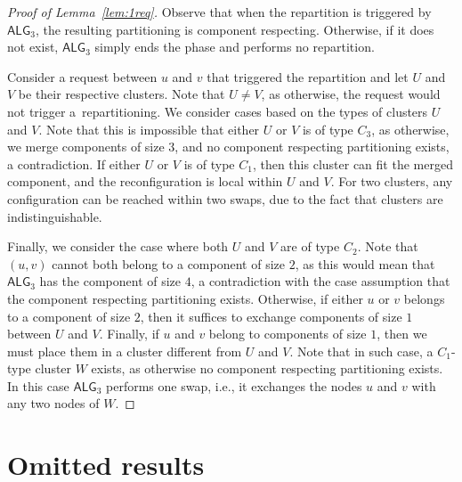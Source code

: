 \documentclass[manuscript,screen=true, review, anonymous]{acmart}
\newcommand{\TAlg}{{\ensuremath{\textsf{ALG}_{3}}}\xspace} %
\begin{document}
\begin{proof}[Proof of Lemma~\ref{lem:1req}]
  Observe that when the repartition is triggered by \TAlg, the resulting partitioning is component respecting.
  Otherwise, if it does not exist, \TAlg simply ends the phase and performs no repartition.

  
    Consider a request between $u$ and $v$ that triggered the repartition and let $U$ and $V$ be their respective clusters.
    Note that $U\neq V$,
	 as otherwise, the request would not trigger a~repartitioning.
	 We consider cases based on the types of clusters $U$ and $V$.
    Note that this is impossible that either $U$ or $V$ is of type $C_3$, as otherwise, we merge components of size $3$, and no component respecting partitioning exists, a contradiction.
    If either $U$ or $V$ is of type $C_1$, then this cluster can fit the merged component, and the reconfiguration is local within $U$ and $V$.
    For two clusters, any configuration can be reached within two swaps, due to the fact that clusters are indistinguishable.
  
    Finally, we consider the case where both $U$ and $V$ are of type $C_2$. Note that $(u,v)$ cannot both belong to a component of size $2$, as this would mean that \TAlg has the component of size $4$, a contradiction with the case assumption that the component respecting partitioning exists. 
    Otherwise, if either $u$ or $v$ belongs to a component of size $2$, then it suffices to exchange components of size $1$ between $U$ and $V$.
    Finally, if $u$ and $v$ belong to components of size $1$, then we must place them in a cluster different from $U$ and $V$.
    Note that in such case, a $C_1$-type cluster $W$ exists, as otherwise no component respecting partitioning exists. In this case \TAlg performs one swap, i.e., it exchanges the nodes $u$ and $v$ with any two nodes of $W$.
\end{proof}

\section{Omitted results}
\end{document}

